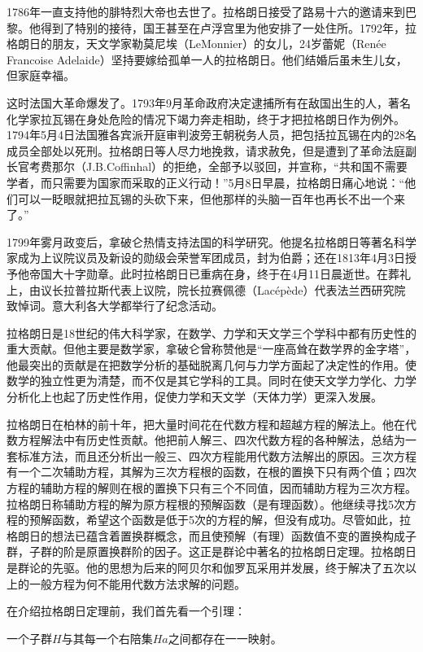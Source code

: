 \documentclass[b5paper]{ctexart}
\begin{document}
1786年一直支持他的腓特烈大帝也去世了。拉格朗日接受了路易十六的邀请来到巴黎。他得到了特别的接待，国王甚至在卢浮宫里为他安排了一处住所。1792年，拉格朗日的朋友，天文学家勒莫尼埃（LeMonnier）的女儿，24岁蕾妮（Renée Francoise Adelaide）坚持要嫁给孤单一人的拉格朗日。他们结婚后虽未生儿女，但家庭幸福。

这时法国大革命爆发了。1793年9月革命政府决定逮捕所有在敌国出生的人，著名化学家拉瓦锡在身处危险的情况下竭力奔走相助，终于才把拉格朗日作为例外。1794年5月4日法国雅各宾派开庭审判波旁王朝税务人员，把包括拉瓦锡在内的28名成员全部处以死刑。拉格朗日等人尽力地挽救，请求赦免，但是遭到了革命法庭副长官考费那尔（J.B.Coffinhal）的拒绝，全部予以驳回，并宣称，“共和国不需要学者，而只需要为国家而采取的正义行动！”5月8日早晨，拉格朗日痛心地说：“他们可以一眨眼就把拉瓦锡的头砍下来，但他那样的头脑一百年也再长不出一个来了。”\cite{Wiki-Lagrange}

1799年雾月政变后，拿破仑热情支持法国的科学研究。他提名拉格朗日等著名科学家成为上议院议员及新设的勋级会荣誉军团成员，封为伯爵；还在1813年4月3日授予他帝国大十字勋章。此时拉格朗日已重病在身，终于在4月11日晨逝世。在葬礼上，由议长拉普拉斯代表上议院，院长拉赛佩德（Lacépède）代表法兰西研究院致悼词。意大利各大学都举行了纪念活动。

拉格朗日是18世纪的伟大科学家，在数学、力学和天文学三个学科中都有历史性的重大贡献。但他主要是数学家，拿破仑曾称赞他是“一座高耸在数学界的金字塔”，他最突出的贡献是在把数学分析的基础脱离几何与力学方面起了决定性的作用。使数学的独立性更为清楚，而不仅是其它学科的工具。同时在使天文学力学化、力学分析化上也起了历史性作用，促使力学和天文学（天体力学）更深入发展。

拉格朗日在柏林的前十年，把大量时间花在代数方程和超越方程的解法上。他在代数方程解法中有历史性贡献。他把前人解三、四次代数方程的各种解法，总结为一套标准方法，而且还分析出一般三、四次方程能用代数方法解出的原因。三次方程有一个二次辅助方程，其解为三次方程根的函数，在根的置换下只有两个值；四次方程的辅助方程的解则在根的置换下只有三个不同值，因而辅助方程为三次方程。拉格朗日称辅助方程的解为原方程根的预解函数（是有理函数）。他继续寻找5次方程的预解函数，希望这个函数是低于5次的方程的解，但没有成功。尽管如此，拉格朗日的想法已蕴含着置换群概念，而且使预解（有理）函数值不变的置换构成子群，子群的阶是原置换群阶的因子。这正是群论中著名的拉格朗日定理。拉格朗日是群论的先驱。他的思想为后来的阿贝尔和伽罗瓦采用并发展，终于解决了五次以上的一般方程为何不能用代数方法求解的问题。

在介绍拉格朗日定理前，我们首先看一个引理：

\begin{lemma}
一个子群$H$与其每一个右陪集$Ha$之间都存在一一映射。
\end{lemma}
\end{document}
